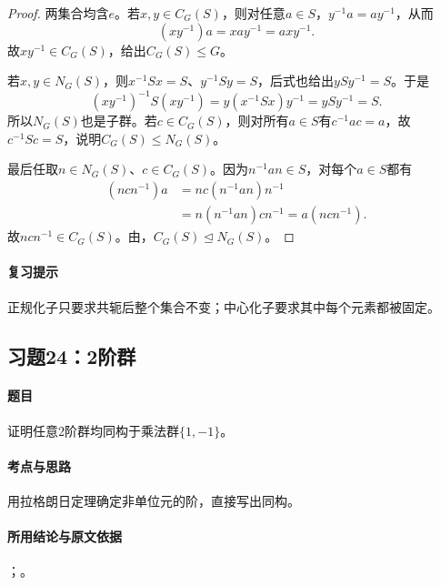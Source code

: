
\begin{proof}
两集合均含$e$。若$x,y\in C_G(S)$，则对任意$a\in S$，$y^{-1}a=ay^{-1}$，从而
\[
(xy^{-1})a=xay^{-1}=axy^{-1}.
\]
故$xy^{-1}\in C_G(S)$，给出$C_G(S)\leq G$。

若$x,y\in N_G(S)$，则$x^{-1}Sx=S$、$y^{-1}Sy=S$，后式也给出$ySy^{-1}=S$。于是
\[
(xy^{-1})^{-1}S(xy^{-1})=y(x^{-1}Sx)y^{-1}=ySy^{-1}=S.
\]
所以$N_G(S)$也是子群。若$c\in C_G(S)$，则对所有$a\in S$有$c^{-1}ac=a$，故$c^{-1}Sc=S$，说明$C_G(S)\leq N_G(S)$。

最后任取$n\in N_G(S)$、$c\in C_G(S)$。因为$n^{-1}an\in S$，对每个$a\in S$都有
\begin{align*}
(ncn^{-1})a&=nc(n^{-1}an)n^{-1}\\
&=n(n^{-1}an)cn^{-1}=a(ncn^{-1}).
\end{align*}
故$ncn^{-1}\in C_G(S)$。由，$C_G(S)\trianglelefteq N_G(S)$。
\end{proof}

\paragraph{复习提示}
正规化子只要求共轭后整个集合不变；中心化子要求其中每个元素都被固定。


\subsection{习题24：\texorpdfstring{2阶群}{2阶群}}
\label{ex:1:24}

\paragraph{题目}
证明任意2阶群均同构于乘法群$\{1,-1\}$。

\paragraph{考点与思路}
用拉格朗日定理确定非单位元的阶，直接写出同构。

\paragraph{所用结论与原文依据}
；。


